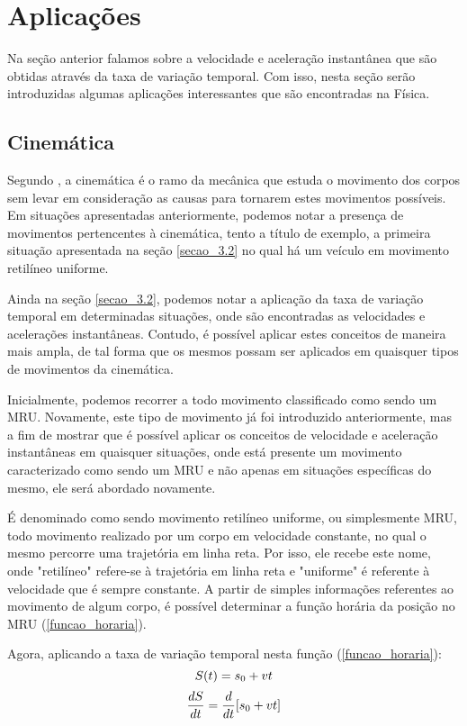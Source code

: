 \documentclass[
	12pt,				%
	openright,			%
    twoside,			%
	a4paper,			%
	chapter=TITLE,		%
	english,			%
	french,				%
	spanish,			%
	brazil				%
	]{abntex2}
\numberwithin{lema}{chapter}
\numberwithin{teorema}{chapter}
\numberwithin{definicao}{chapter}
\numberwithin{exemplo}{chapter}
\numberwithin{figure}{chapter}
\begin{document}
\section{Aplicações}

Na seção anterior falamos sobre a velocidade e aceleração instantânea que são obtidas através da taxa de variação temporal. Com isso, nesta seção serão introduzidas algumas aplicações interessantes que são encontradas na Física.

\subsection{Cinemática}

Segundo , a cinemática é o ramo da mecânica que estuda o movimento dos corpos sem levar em consideração as causas para tornarem estes movimentos possíveis. Em situações apresentadas anteriormente, podemos notar a presença de movimentos pertencentes à cinemática, tento a título de exemplo, a primeira situação apresentada na seção \ref{secao_3.2} no qual há um veículo em movimento retilíneo uniforme.

Ainda na seção \ref{secao_3.2}, podemos notar a aplicação da taxa de variação temporal em determinadas situações, onde são encontradas as velocidades e acelerações instantâneas. Contudo, é possível aplicar estes conceitos de maneira mais ampla, de tal forma que os mesmos possam ser aplicados em quaisquer tipos de movimentos da cinemática.

Inicialmente, podemos recorrer a todo movimento classificado como sendo um MRU. Novamente, este tipo de movimento já foi introduzido anteriormente, mas a fim de mostrar que é possível aplicar os conceitos de velocidade e aceleração instantâneas em quaisquer situações, onde está presente um movimento caracterizado como sendo um MRU e não apenas em situações específicas do mesmo, ele será abordado novamente.

É denominado como sendo movimento retilíneo uniforme, ou simplesmente MRU, todo movimento realizado por um corpo em velocidade constante, no qual o mesmo percorre uma trajetória em linha reta. Por isso, ele recebe este nome, onde "retilíneo" refere-se à trajetória em linha reta e "uniforme" é referente à velocidade que é sempre constante. A partir de simples informações referentes ao movimento de algum corpo, é possível determinar a função horária da posição no MRU (\ref{funcao_horaria}).

Agora, aplicando a taxa de variação temporal nesta função (\ref{funcao_horaria}):
$$S(t) = s_0 + vt \\$$
$$\dfrac{dS}{dt} = \dfrac{d}{dt}[s_0 + vt]\\$$
\end{document}
